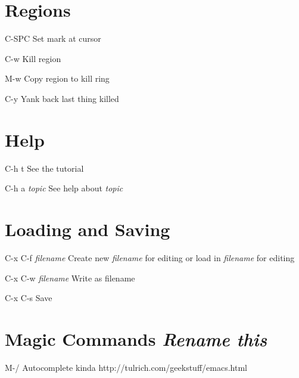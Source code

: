 \documentclass[11pt,a4paper]{article}
\begin{document}
\begin{multicols}{2}
\section{Regions}
\begin{eqlist}
\item[C-SPC] Set mark at cursor
\item[C-w] Kill region
\item[M-w] Copy region to kill ring
\item[C-y] Yank back last thing killed

\end{eqlist}

\section{Help}
\begin{eqlist}
\item[C-h t] See the tutorial
\item[C-h a \textit{topic}] See help about \textit{topic}
\end{eqlist}

\section{Loading and Saving}
\begin{eqlist}
\item[C-x C-f \textit{filename}] Create new \textit{filename} for
  editing or load in \textit{filename} for editing
\item[C-x C-w \textit{filename}] Write as filename
\item[C-x C-s] Save
\end{eqlist}

\section{Magic Commands \textit{Rename this}}
\begin{eqlist}
\item[M-/] Autocomplete kinda http://tulrich.com/geekstuff/emacs.html
\end{eqlist}

\end{multicols}

\let\thefootnote\relax{}
\end{document}
